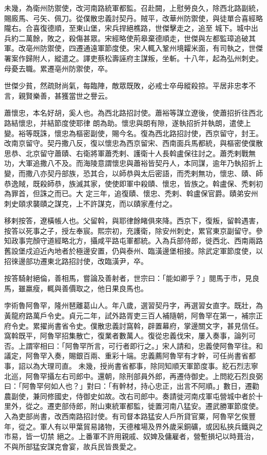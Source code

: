 \begin{pinyinscope}
 未幾，為衛州防禦使，改河南路統軍都監。召赴闕，上慰勞良久，除西北路副統，賜廄馬、弓矢、佩刀。從僕散忠義討契丹。賊平，改華州防禦使，與徒單合喜經略隴右。合喜復德順，至東山堡，宋兵捍絕樵路，世傑擊走之，追至
 城下。城中出兵約二萬餘，敗之，殺傷甚眾。宋經略使荊皋棄德順走，世傑與左都監璋追破其軍。改亳州防禦使，四遷通遠軍節度使。宋人輒入鞏州境糶米面，有司執之，世傑署案作歸附人，縱遣之。譯吏蔡松壽誣府主謀叛，坐斬。十八年，起為弘州刺史。母憂去職。累遷亳州防禦使，卒。



 世傑少貧，然疏財尚氣，每臨陣，敵眾既敗，必戒士卒毋縱殺掠。平居非忠孝不言，親賢樂善，甚獲當世之譽云。



 蕭懷忠，本名好胡，奚人也。為西北路招討使。蕭裕等謀立遼後，使蕭招折往西北路結懷忠，并結節度使耶律
 朗為助。懷忠與朗有隙，遂執招折并執朗，遣使上變。裕等既誅，懷忠為樞密副使，賜今名。復為西北路招討使，西京留守，封王。改南京留守。契丹撒八反，復以懷忠為西京留宋、西南面兵馬都統，與樞密使僕散思恭、北京留守蕭賾、右衛將軍蕭禿剌、護衛十人長斡盧保往討之。蕭禿剌戰無功，大軍追撒八不及。而海陵意謂懷忠與蕭裕皆契丹人，本同謀，逾年乃執招折上變，而撒八亦契丹部族，恐其合，以師恭與太后密語，而禿剌無功，懷忠、賾、師恭逸賊，既殺師恭，族滅其家，使使即軍中殺賾、懷忠，皆族之。斡盧保、禿剌初為罪首，但誅之而已。大
 定三年，追復賾、懷忠、禿剌、斡盧保官爵。賾弟安州刺史頤求襲賾之謀克，上不許謀克，而以賾家產付之。



 移剌按答，遼橫帳人也。父留斡，與耶律餘睹俱來降。西京下，復叛，留斡遇害，按答以死事之子，授左奉宸。熙宗初，充護衛，除安州刺史，累官東京副留守。參知政事完顏守道經略北方，攝咸平路屯軍都統。入為兵部侍郎，徙西北、西南兩路舊設堡戍迫近內地者於極邊安置，仍與泰州、臨潢邊堡相接。除武定軍節度使，以招徠邊部功遷東北路招討使，改臨潢尹，卒。



 按答騎射絕倫，善相馬，嘗論及善射者，世宗曰：「能如卿乎？」閱馬于市，見良
 馬，雖羸瘦，輒與善價取之，他日果良馬也。



 孛術魯阿魯罕，隆州琶離葛山人。年八歲，選習契丹字，再選習女直字。既壯，為黃龍府路萬戶令史。貞元二年，試外路胥吏三百人補隨朝，阿魯罕在第一，補宗正府令史。累擢尚書省令史。僕散忠義討窩斡，辟置幕府，掌邊關文字，甚見信任。窩斡既平，阿魯罕招集散亡，復業者數萬人。復從忠義伐宋，屢入奏事，論列可否。上謂宰相曰：「阿魯罕所言，可行者即行之。」宋人請和，忠義使阿魯罕往。和議定，阿魯罕入奏，賜銀百兩、重彩十端。忠義薦阿魯罕有才幹，可任尚書省都事，詔以為大理司直。
 未幾，授尚書省都事，除同知順天軍節度事。紇石烈志寧北巡，阿魯罕攝左右司郎中。還朝，除刑部員外郎，再遷侍御史。上問紇石烈良弼曰：「阿魯罕何如人也？」對曰：「有幹材，持心忠正，出言不阿順。」數日，遷勸農副使，兼同修國史，侍御史如故。改右司郎中。奏請徙河南戍軍屯營城中者於十里外，從之。遷吏部侍郎，附山東統軍都監，徙置河南八猛安。遷武勝軍節度使。入為吏部尚書，改西南路招討使。有司督本路猛安人戶所貸官粟，阿魯罕乞俟豐年，從之。軍人有以甲葉貿易諸物，天德榷場及界外歲采銅礦，或因私挾兵鐵與之市易，皆一切禁
 絕之。上番軍不許用親戚、奴婢及傭雇者，營塹損圮以時葺治，不與所部猛安謀克會宴，故兵民皆畏愛之。




\end{pinyinscope}

